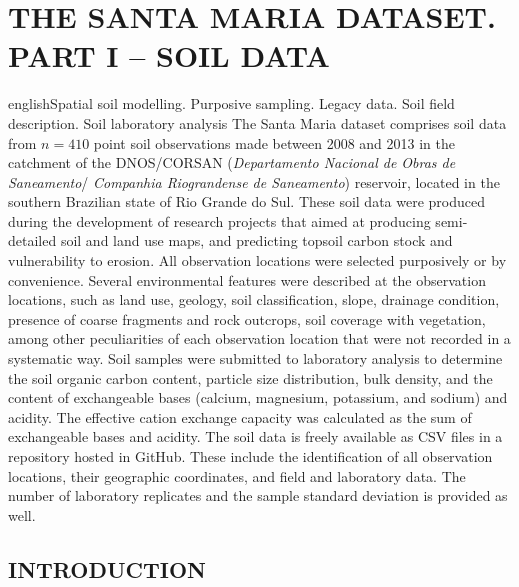 \artigotrue
\chapter{THE SANTA MARIA DATASET. PART I -- SOIL DATA}
\label{chap:chap04}



\def\enkeys{Spatial soil modelling. Purposive sampling. Legacy data. Soil field description. Soil laboratory 
analysis}
  
\begin{chapterabstract}{english}{\enkeys}
The Santa Maria dataset comprises soil data from $n = 410$ point soil observations made between \num{2008} and 
\num{2013} in the catchment of the DNOS/CORSAN (\textit{Departamento Nacional de Obras de Saneamento}/
\textit{Companhia Riograndense de Saneamento}) reservoir, located in the southern Brazilian state of Rio 
Grande do Sul. These soil data were produced during the development of research projects that aimed at 
producing semi-detailed soil and land use maps, and predicting topsoil carbon stock and vulnerability to 
erosion. All observation locations were selected purposively or by convenience. Several environmental features 
were described at the observation locations, such as land use, geology, soil classification, slope, drainage 
condition, presence of coarse fragments and rock outcrops, soil coverage with vegetation, among 
other peculiarities of each observation location that were not recorded in a systematic way. Soil samples were 
submitted to laboratory analysis to determine the soil organic carbon content, particle size distribution, 
bulk density, and the content of exchangeable bases (calcium, magnesium, potassium, and sodium) and acidity. 
The effective cation exchange capacity was calculated as the sum of exchangeable bases and acidity. The soil 
data is freely available as CSV files in a repository hosted in GitHub. These include the identification of 
all observation locations, their geographic coordinates, and field and laboratory data. The number of 
laboratory replicates and the sample standard deviation is provided as well.
\end{chapterabstract}

\formatchapter

\section{INTRODUCTION}
\label{sec:chap04-introduction}

